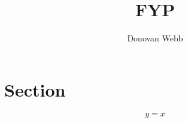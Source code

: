 \documentclass[11pt]{iopart}
\begin{document}
\title[]{FYP}

\author{Donovan Webb}

\address{Department of Physics,
University of Bath, Bath BA2 7AY, United Kingdom}

\begin{abstract}
\end{abstract}

\section{Section}

\begin{equation}
  y=x
  \end{equation}
\end{document}
